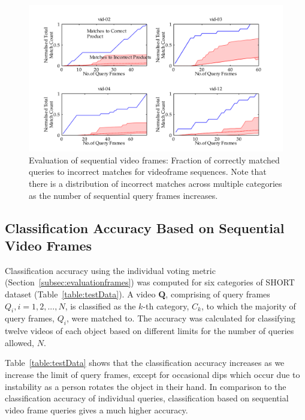 \begin{figure}[htb]
\centering
\includegraphics[width=\linewidth]{./gfx/Chapter02/prd0030shadedPlots-4-latex.pdf}
\caption{Evaluation of sequential video frames: Fraction of correctly matched queries to incorrect matches for videoframe sequences. Note that there is a distribution of incorrect matches across multiple categories as the number of sequential query frames increases.}        
\label{fig:prd003b}
\end{figure}


\subsection{Classification Accuracy Based on Sequential Video Frames} \label{sec:expResults2}

Classification accuracy using the individual voting metric (Section~\ref{subsec:evaluationframes}) was computed for six categories of SHORT dataset (Table~\ref{table:testData}). A video $\mathbf{Q}$, comprising of query frames $Q_i, i = 1,2,...,N$, is classified as the $k$-th category, $C_k$, to which the majority of query frames, $Q_i$, were matched to. The accuracy was calculated for classifying twelve videos of each object based on different limits for the number of queries allowed, $N$.

Table~\ref{table:testData} shows that the classification accuracy increases as we increase the limit of query frames, except for occasional dips which occur due to instability as a person rotates the object in their hand. In comparison to the classification accuracy of individual queries, classification based on sequential video frame queries gives a much higher accuracy.


